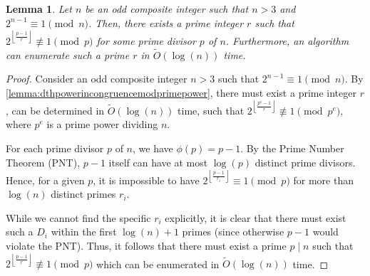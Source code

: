 \documentclass{article}
\theoremstyle{plain}
\theoremstyle{definition}
\newtheorem{lemma}{Lemma}
\newcommand{\floor}[1]{\left\lfloor #1 \right\rfloor}
\newcommand{\totient}[1]{\phi\left({#1}\right)}
\newcommand{\D}{r}
\newcommand{\primep}{p}
\begin{document}
\begin{lemma}\label{lemma:dthpowerincongruencemodprime}
\textit{Let $n$ be an odd composite integer such that $n > 3$ and $2^{n-1} \equiv 1 \pmod{n}$. Then, there exists a prime integer $\D$ such that $2^{\floor{\frac{\primep-1}{\D}}} \not\equiv 1 \pmod{\primep}$ for some prime divisor $\primep$ of $n$. Furthermore, an algorithm can enumerate such a prime $\D$ in $\tilde{O}(\log(n))$ time.}
\end{lemma}
\begin{proof}
Consider an odd composite integer $n > 3$ such that $2^{n-1} \equiv 1 \pmod{n}$. By \cref{lemma:dthpowerincongruencemodprimepower}, there must exist a prime integer $\D$, can be determined in $\tilde{O}(\log(n))$ time, such that $2^{\left\lfloor\frac{\primep^e-1}{\D}\right\rfloor} \not\equiv 1 \pmod{\primep^e}$, where $\primep^e$ is a prime power dividing $n$.

For each prime divisor $\primep$ of $n$, we have $\totient{\primep} = \primep-1$. By the Prime Number Theorem (PNT), $\primep-1$ itself can have at most $\log(\primep)$ distinct prime divisors. Hence, for a given $\primep$, it is impossible to have $2^{\left\lfloor\frac{\primep-1}{\D_i}\right\rfloor} \equiv 1 \pmod{\primep}$ for more than $\log(n)$ distinct primes $\D_i$.

While we cannot find the specific $\D_i$ explicitly, it is clear that there must exist such a $D_i$ within the first $\log(n)+1$ primes (since otherwise $\primep-1$ would violate the PNT). Thus, it follows that there must exist a prime $\primep \mid n$ such that $2^{\left\lfloor\frac{\primep-1}{\D}\right\rfloor} \not\equiv 1 \pmod{\primep}$ which can be enumerated in $\tilde{O}(\log(n))$ time.
\end{proof}
\end{document}
